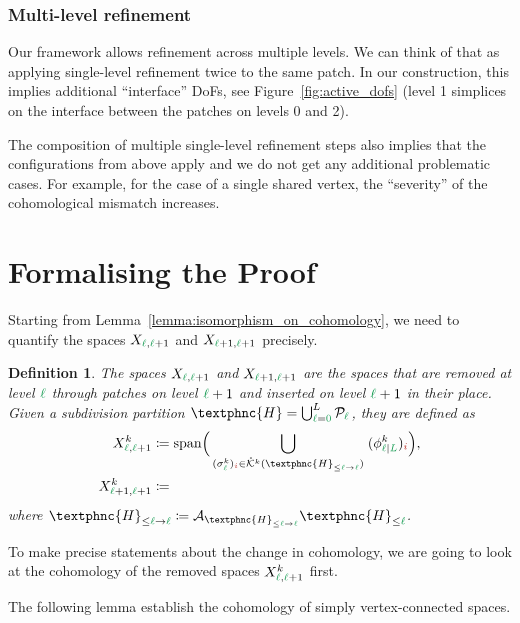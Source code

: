 \documentclass[12pt, a4paper]{article}
\newcommand{\green}{\color{ForestGreen}}
\newcommand{\brickred}{\color{BrickRed}}
\newcommand{\K}{\mathcal{K}}
\newcommand{\simplexname}{\sigma}
\newcommand{\simplex}[3]{\freeQ{\simplexname}{#1}{#2}{#3}}
\newcommand{\coarseIdxone}{{\brickred i}}
\renewcommand{\l}{{\green\ell}}
\renewcommand{\L}{{\green L}}
\newcommand{\lzero}{{\green 0}}
\newcommand{\constrQ}[5]{({#1}^{#2}_{#3 \vert #4})_{#5}}
\newcommand{\freeQ}[4]{({#1}^{#2}_{#3})_{#4}}
\newcommand{\SDFbasis}{\phi}
\newcommand{\heth}{\textphnc{H}}
\newcommand{\C}{\heth}
\newcommand{\calP}{\mathcal{P}}
\newtheorem{definition}[theorem]{Definition}
\numberwithin{equation}{section}
\begin{document}
\subsubsection{Multi-level refinement}

Our framework allows refinement across multiple levels. We can think of that as applying single-level refinement twice to the same patch. In our construction, this implies additional ``interface'' DoFs, see Figure~\ref{fig:active_dofs} (level 1 simplices on the interface between the patches on levels 0 and 2). 

The composition of multiple single-level refinement steps also implies that the configurations from above apply and we do not get any additional problematic cases. For example, for the case of a single shared vertex, the ``severity'' of the cohomological mismatch increases.

\section{Formalising the Proof}

Starting from Lemma~\ref{lemma:isomorphism_on_cohomology}, we need to quantify the spaces $X_{\l,\l+1}$ and $X_{\l+1, \l+1}$ precisely.

\begin{definition}
    The spaces $X_{\l,\l+1}$ and $X_{\l+1, \l+1}$ are the spaces that are removed at level $\l$ through patches on level $\l+1$ and inserted on level $\l+1$ in their place. Given a subdivision partition $\C = \bigcup_{\l = \lzero}^L \calP_\l$, they are defined as
    \begin{equation}
    \begin{aligned}
        X^k_{\l,\l+1} &\coloneqq \mathrm{span} \Big( \bigcup_{\simplex{k}{\l}{\coarseIdxone} \in \mathring{\K}^k ( \C_{\leq \l \to \l} )} \; \constrQ{\SDFbasis}{k}{\l}{\L}{\coarseIdxone} \Big), \\
        X^k_{\l+1,\l+1} &\coloneqq 
    \end{aligned}
    \end{equation}
    where $\C_{\leq \l \to \l} \coloneqq \mathcal{A}_{\C_{\leq \l \to \l}} \C_{\leq \l}$.
\end{definition}

To make precise statements about the change in cohomology, we are going to look at the cohomology of the removed spaces $X^k_{\l, \l+1}$ first.

The following lemma establish the cohomology of simply vertex-connected spaces.
\end{document}

